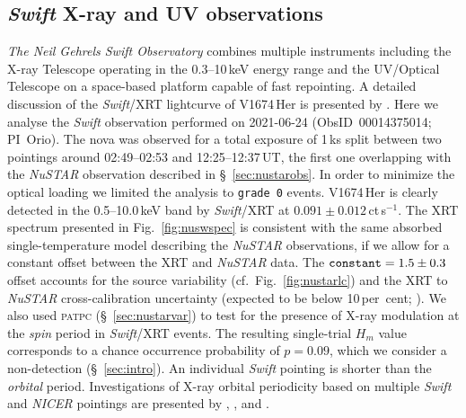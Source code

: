 \documentclass[a4paper,fleqn,usenatbib]{mnras}
\newcommand{\nova}{V1674\,Her}
\begin{document}
\subsection{{\em Swift} X-ray and UV observations}
\label{sec:swiftobs}

{\em The Neil Gehrels Swift Observatory} \citep{2004ApJ...611.1005G}
combines multiple instruments 
including the X-ray Telescope \citep[XRT;][]{2005SSRv..120..165B} operating
in the 0.3--10\,keV energy range and 
the UV/Optical Telescope \citep[UVOT;][]{2005SSRv..120...95R}
on a space-based platform capable of fast repointing.
%
A detailed discussion of the {\em Swift}/XRT lightcurve of \nova{} is presented
by \cite{2021ApJ...922L..42D}. Here we analyse the {\em Swift} observation
performed on 2021-06-24 (ObsID~00014375014; PI~Orio). 
The nova was observed for a total exposure of 1\,ks split between 
two pointings around 02:49--02:53 and 12:25--12:37\,UT,
the first one overlapping with the {\em NuSTAR} observation described in
\S~\ref{sec:nustarobs}. In order to minimize the optical loading
we limited the analysis to \texttt{grade~0} events.
\nova{} is clearly detected in the 0.5--10.0\,keV
band by {\em Swift}/XRT at $0.091 \pm0.012$\,ct\,s$^{-1}$. The XRT spectrum 
presented in Fig.~\ref{fig:nuswspec} is consistent with the same absorbed single-temperature model  
describing the {\em NuSTAR} observations, if we allow for a constant offset
between the XRT and {\em NuSTAR} data. The ${\rm \texttt{constant}} = 1.5 \pm 0.3$ offset
accounts for the source variability (cf.~Fig.~\ref{fig:nustarlc}) and
the XRT to {\em NuSTAR} cross-calibration uncertainty (expected to be below
10\,per~cent; \citealt{2017AJ....153....2M}).
%
We also used \textsc{patpc} (\S~\ref{sec:nustarvar}) to test for the
presence of X-ray modulation at the {\it spin} period in {\em Swift}/XRT events. 
The resulting single-trial $H_m$ value corresponds to a chance occurrence probability 
of $p = 0.09$, which we consider a non-detection (\S~\ref{sec:intro}). 
An individual {\em Swift} pointing is shorter than the {\it orbital} period.
Investigations of X-ray orbital periodicity based on multiple {\em Swift} and {\em NICER} 
pointings are presented by \cite{2021ApJ...922L..42D}, \cite{2022ApJ...932...45O}, and \cite{2022MNRAS.517L..97L}.
\end{document}
